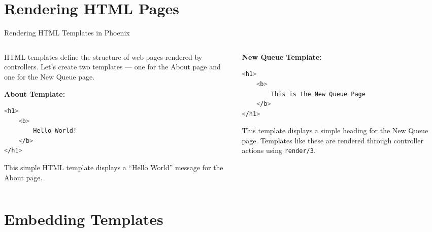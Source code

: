 \documentclass[aspectratio=169, table]{beamer}
\begin{document}
\section{Rendering HTML Pages}

\begin{frame}[fragile]{Rendering HTML Templates in Phoenix}
\vspace{20pt}

\begin{columns}
  \begin{column}[T]{0.52\textwidth}
    HTML templates define the structure of web pages rendered by controllers.  
    Let’s create two templates — one for the About page and one for the New Queue page.

    \textbf{About Template:}
\begin{lstlisting}[language=bash, basicstyle=\ttfamily\footnotesize]
<h1>
	<b>
		Hello World!
	</b>
</h1>
\end{lstlisting}
    This simple HTML template displays a “Hello World” message for the About page.
  \end{column}

  \begin{column}[T]{0.43\textwidth}
    \textbf{New Queue Template:}
\begin{lstlisting}[language=bash, basicstyle=\ttfamily\footnotesize]
<h1>
	<b>
		This is the New Queue Page
	</b>
</h1>
\end{lstlisting}

    This template displays a simple heading for the New Queue page.  
    Templates like these are rendered through controller actions using \texttt{render/3}.
  \end{column}
\end{columns}
\end{frame}


\section{Embedding Templates}
\end{document}
